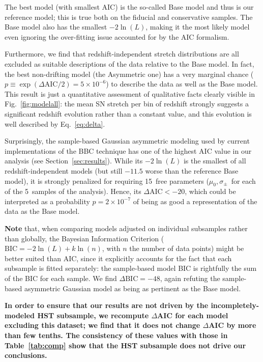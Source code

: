 \documentclass[referee]{aa}
\begin{document}
The best model (with smallest AIC) is the so-called Base model and thus is our
reference model; this is true both on the fiducial and conservative samples.
The Base model also has the smallest $-2\ln(L)$, making it the most likely
model even ignoring the over-fitting issue accounted for by the AIC formalism.

Furthermore, we find that redshift-independent stretch distributions are all
excluded as suitable descriptions of the data relative to the Base model. In
fact, the best non-drifting model (the Asymmetric one) has a very marginal
chance ($p \equiv \exp\left(\Delta\mathrm{AIC}/2\right) = 5\times10^{-6}$) to
describe the data as well as the Base model. This result is just a quantitative
assessment of qualitative facts clearly visible in Fig.~\ref{fig:modelall}: the
mean SN stretch per bin of redshift strongly suggests a significant redshift
evolution rather than a constant value, and this evolution is well described by
Eq.~\ref{eq:delta}.

Surprisingly, the sample-based Gaussian asymmetric modeling used by current
implementations of the BBC technique \citep{scolnic2016, kessler2017} has one of
the highest AIC value in our analysis (see Section~\ref{sec:results}). While its
$-2\ln(L)$ is the smallest of all redshift-independent models (but still $-11.5$
worse than the reference Base model), it is strongly penalized for requiring
15~free parameters ($\mu_0, \sigma_{\pm}$~for each of the 5~samples of the
analysis). Hence, its $\Delta\mathrm{AIC}<-20$, which could be interpreted as a
probability $p=2\times 10^{-7}$ of being as good a representation of the data
as the Base model.

\textbf{Note} that, when comparing models adjusted on individual subsamples
rather than globally, the Bayesian Information Criterion ($\mathrm{BIC} =
-2\ln(L) + k\ln(n)$, with $n$ the number of data points) might be better suited
than AIC, since it explicitly accounts for the fact that each subsample is
fitted separately: the sample-based model BIC is rightfully the sum of the BIC
for each sample. We find $\Delta\mathrm{BIC}=-48$, again refuting the
sample-based asymmetric Gaussian model as being as pertinent as the Base model.

\textbf{In order to ensure that our results are not driven by the
    incompletely-modeled HST subsample, we recompute $\Delta$AIC for each model
    excluding this dataset; we find that it does not change $\Delta$AIC by more
    than few tenths. The consistency of these values with those in
    Table~\ref{tab:comp} show that the HST subsample does not drive our
conclusions.}
\end{document}
